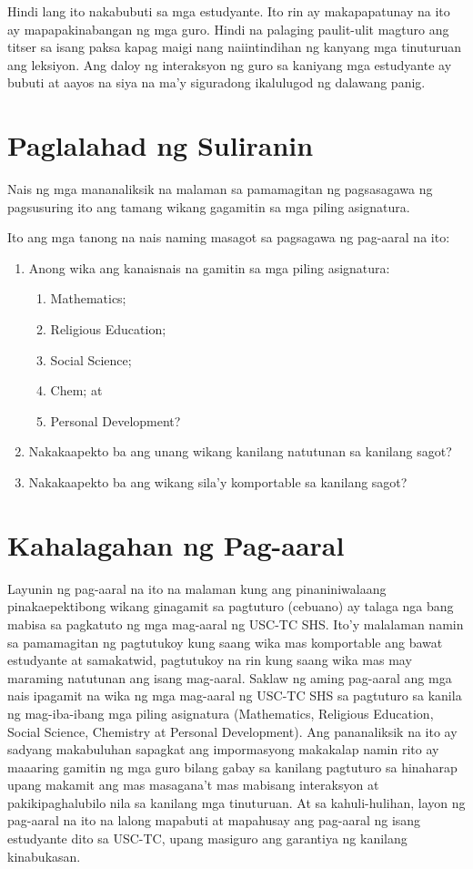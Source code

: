 \documentclass [11pt] {report}
\begin{document}
Hindi lang ito nakabubuti sa mga estudyante. Ito rin ay makapapatunay na ito ay
mapapakinabangan ng mga guro. Hindi na palaging paulit-ulit magturo ang titser
sa isang paksa kapag maigi nang naiintindihan ng kanyang mga tinuturuan ang
leksiyon. Ang daloy ng interaksyon ng guro sa kaniyang mga estudyante ay bubuti
at aayos na siya na ma'y siguradong ikalulugod ng dalawang panig.
\pagebreak
\section {Paglalahad ng Suliranin}
Nais ng mga mananaliksik na malaman sa pamamagitan ng pagsasagawa ng pagsusuring
ito ang tamang wikang gagamitin sa mga piling asignatura.

Ito ang mga tanong na nais naming masagot sa pagsagawa ng pag-aaral na ito:

\begin{enumerate}[parsep=\baselineskip,itemsep=-0.5\baselineskip]
\item Anong wika ang kanaisnais na gamitin sa mga piling asignatura:
  \begin{enumerate}[nosep]
  \item Mathematics;
  \item Religious Education;
  \item Social Science;
  \item Chem; at
  \item Personal Development?
  \end{enumerate}
\item Nakakaapekto ba ang unang wikang kanilang natutunan sa kanilang sagot?
\item Nakakaapekto ba ang wikang sila'y komportable sa kanilang sagot?
\end{enumerate}

\section{Kahalagahan ng Pag-aaral}
Layunin ng pag-aaral na ito na malaman kung ang pinaniniwalaang pinakaepektibong
wikang ginagamit sa pagtuturo (\gls{cebuano}) ay talaga nga bang mabisa sa
pagkatuto ng mga mag-aaral ng USC-TC SHS. Ito’y malalaman namin sa pamamagitan
ng pagtutukoy kung saang wika mas komportable ang bawat estudyante at
samakatwid, pagtutukoy na rin kung saang wika mas may maraming natutunan ang
isang mag-aaral. Saklaw ng aming pag-aaral ang mga nais ipagamit na wika ng mga
mag-aaral ng USC-TC SHS sa pagtuturo sa kanila ng mag-iba-ibang mga piling
asignatura (Mathematics, Religious Education, Social Science, Chemistry at
Personal Development). Ang pananaliksik na ito ay sadyang makabuluhan sapagkat
ang impormasyong makakalap namin rito ay maaaring gamitin ng mga guro bilang
gabay sa kanilang pagtuturo sa hinaharap upang makamit ang mas masagana’t mas
mabisang interaksyon at pakikipaghalubilo nila sa kanilang mga tinuturuan. At sa
kahuli-hulihan, layon ng pag-aaral na ito na lalong mapabuti at mapahusay ang
pag-aaral ng isang estudyante dito sa USC-TC, upang masiguro ang garantiya ng
kanilang kinabukasan.
\end{document}
